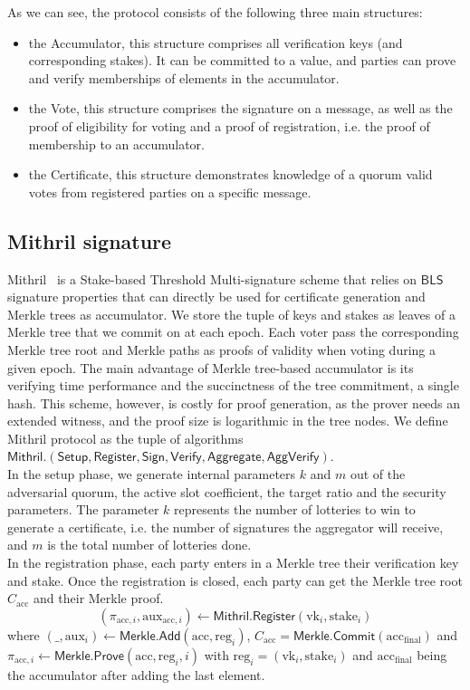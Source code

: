 \documentclass{article}
\newcommand{\vk}[1]{\ensuremath{\textrm{vk}_{#1}}\xspace}
\newcommand{\acc}{\ensuremath{\textrm{acc}}\xspace}
\newcommand{\aux}{\ensuremath{\textrm{aux}}\xspace}
\newcommand{\reg}[1]{\ensuremath{\textrm{reg}_{#1}}\xspace}
\newcommand{\stake}[1]{\ensuremath{\textrm{stake}_{#1}}\xspace}
\newcommand{\BLS}{\ensuremath{\mathsf{BLS}}\xspace}
\newcommand{\Merkle}{\ensuremath{\mathsf{Merkle}}\xspace}
\newcommand{\Mithril}{\ensuremath{\mathsf{Mithril}}\xspace}
\newcommand{\Sign}{\ensuremath{\mathsf{Sign}}\xspace}
\newcommand{\Verify}{\ensuremath{\mathsf{Verify}}\xspace}
\newcommand{\Aggregate}{\ensuremath{\mathsf{Aggregate}}\xspace}
\newcommand{\AggVerify}{\ensuremath{\mathsf{AggVerify}}\xspace}
\newcommand{\Setup}{\ensuremath{\mathsf{Setup}}\xspace}
\newcommand{\Add}{\ensuremath{\mathsf{Add}}\xspace}
\newcommand{\Prove}{\ensuremath{\mathsf{Prove}}\xspace}
\newcommand{\Commit}{\ensuremath{\mathsf{Commit}}\xspace}
\newcommand{\Register}{\ensuremath{\mathsf{Register}}\xspace}
\begin{document}
As we can see, the protocol consists of the following three main structures:
\begin{itemize}
    \item the Accumulator, this structure comprises all verification keys (and corresponding stakes). It can be committed to a value, and parties can prove and verify memberships of elements in the accumulator.
    \item the Vote, this structure comprises the signature on a message, as well as the proof of eligibility for voting and a proof of registration, i.e. the proof of membership to an accumulator.
    \item the Certificate, this structure demonstrates knowledge of a quorum valid votes from registered parties on a specific message.
\end{itemize}

%
%
\subsection{Mithril signature}
Mithril~\cite{chaidos2024mithril} is a Stake-based Threshold Multi-signature scheme that relies on \BLS signature properties that can directly be used for certificate generation and Merkle trees as accumulator.
%
We store the tuple of keys and stakes as leaves of a Merkle tree that we commit on at each epoch. Each voter pass the corresponding Merkle tree root and Merkle paths as proofs of validity when voting during a given epoch.
The main advantage of Merkle tree-based accumulator is its verifying time performance and the succinctness of the tree commitment, a single hash. This scheme, however, is costly for proof generation, as the prover needs an extended witness, and the proof size is logarithmic in the tree nodes.
%
We define Mithril protocol as the tuple of algorithms $\Mithril.(\Setup, \Register, \Sign, \Verify, \Aggregate, \AggVerify)$.\\

In the setup phase, we generate internal parameters $k$ and $m$ out of the adversarial quorum, the active slot coefficient, the target ratio and the security parameters. The parameter $k$ represents the number of lotteries to win to generate a certificate, i.e. the number of signatures the aggregator will receive, and $m$ is the total number of lotteries done.\\

In the registration phase, each party enters in a Merkle tree their verification key and stake. Once the registration is closed, each party can get the Merkle tree root $C_\acc$ and their Merkle proof.
$$ (\pi_{\acc, i}, \aux_{\acc, i}) \leftarrow \Mithril.\Register(\vk{i}, \stake{i}) $$
where $(\_, \aux_i) \leftarrow \Merkle.\Add(\acc, \reg{i})$, $C_\acc = \Merkle.\Commit(\acc_\text{final})$ and $\pi_{\acc, i} \leftarrow \Merkle.\Prove(\acc, \reg{i}, i)$ with $\reg{i} =(\vk{i}, \stake{i})$ and $\acc_\text{final}$ being the accumulator after adding the last element.\\
\end{document}
